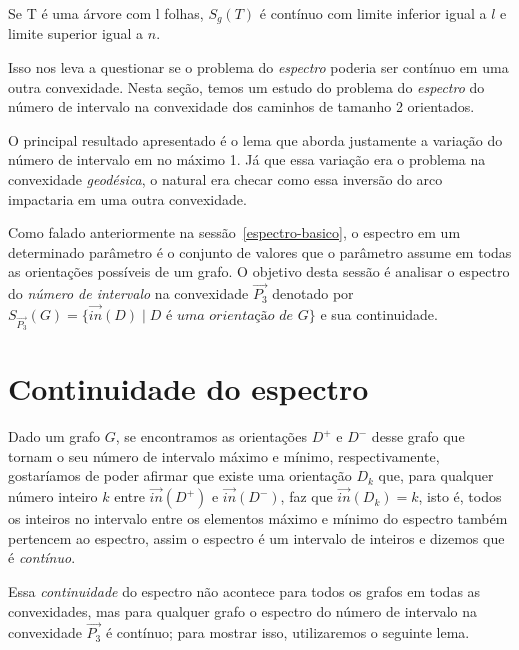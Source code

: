 \begin{theorem}
	Se T é uma árvore com l folhas, $S_g(T)$ é contínuo com limite inferior igual a $l$ e limite superior igual a $n$.
\end{theorem}

Isso nos leva a questionar se o problema do \emph{espectro} poderia ser contínuo em uma outra convexidade. Nesta seção, temos um estudo do problema do \emph{espectro} do número de intervalo na convexidade dos caminhos de tamanho 2 orientados.

O principal resultado apresentado é o lema que aborda justamente a variação do número de intervalo em no máximo 1. Já que essa variação era o problema na convexidade \emph{geodésica}, o natural era checar como essa inversão do arco impactaria em uma outra convexidade.

Como falado anteriormente na sessão~\ref{espectro-basico}, o espectro em um determinado parâmetro é o conjunto de valores que o parâmetro assume em todas as orientações possíveis de um grafo. O objetivo desta sessão é analisar o espectro do \textit{número de intervalo} na convexidade $\overrightarrow{P_3}$ denotado por $S_{\overrightarrow{P_3}}(G) = \{\overrightarrow{in}(D) \mid \textit{D é uma orientação de G}\}$ e sua continuidade.

\section{Continuidade do espectro}

Dado um grafo $G$, se encontramos as orientações $D^+$ e $D^-$ desse grafo que tornam o seu número de intervalo máximo e mínimo, respectivamente, gostaríamos de poder afirmar que existe uma orientação $D_k$ que, para qualquer número inteiro $k$ entre $\overrightarrow{in}(D^+)$ e $\overrightarrow{in}(D^-)$, faz que $\overrightarrow{in}(D_k)=k$, isto é, todos os inteiros no intervalo entre os elementos máximo e mínimo do espectro também pertencem ao espectro, assim o espectro é um intervalo de inteiros e dizemos que é \textit{contínuo}.

Essa \textit{continuidade} do espectro não acontece para todos os grafos em todas as convexidades, mas para qualquer grafo o espectro do número de intervalo na convexidade $\overrightarrow{P_3}$ é contínuo; para mostrar isso, utilizaremos o seguinte lema.

